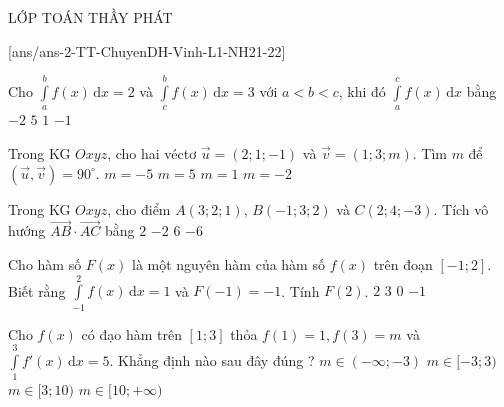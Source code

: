 \begin{name}
{\tenchude}{\tendethi}{LỚP TOÁN THẦY PHÁT}{\thoigian}
\end{name}

[ans/ans-2-TT-ChuyenDH-Vinh-L1-NH21-22]
\begin{ex}%
Cho $\displaystyle\int\limits_a^b f(x)\mathrm{\,d}x=2$ và $\displaystyle\int\limits_c^b f(x)\mathrm{\,d}x=3$ với $a<b<c$, khi đó $\displaystyle\int\limits_a^c f(x)\mathrm{\,d}x$ bằng
\choice
{$-2$}
{$5$}
{$1$}
{\True $-1$}
\end{ex}

\begin{ex}%
Trong KG $Oxyz$, cho hai véctơ $\vec{u}=\left(2;1;-1\right)$ và $\vec{v}=\left(1;3;m\right)$. Tìm $m$ để $\left(\vec{u},\vec{v}\right)=90^\circ$.
\choice
{$m=-5$}
{\True $m=5$}
{$m=1$}
{$m=-2$}
\end{ex}

\begin{ex}%
Trong KG $Oxyz$, cho điểm $A\left(3;2;1\right)$, $B\left(-1;3;2\right)$ và $C\left(2;4;-3\right)$. Tích vô hướng $\vec{AB}\cdot \vec{AC}$ bằng
\choice
{\True $2$}
{$-2$}
{$6$}
{$-6$}
\end{ex}

\begin{ex}%
Cho hàm số $F(x)$ là một nguyên hàm của hàm số $f(x)$ trên đoạn $[-1; 2]$. Biết rằng $\displaystyle\int\limits_{-1}^2 f(x)\mathrm{\,d}x=1$ và $F(-1)=-1$. Tính $F(2)$.
\choice
{$2$}
{$3$}
{\True $0$}
{$-1$}
\end{ex}

\begin{ex}%
Cho $f(x)$ có đạo hàm trên $[1; 3]$ thỏa $f(1)=1, f(3)=m$ và $\displaystyle\int\limits_1^3 f'(x)\mathrm{\,d}x=5$. Khẳng định nào sau đây đúng ?
\choice
{$m \in(-\infty; -3)$}
{$m \in[-3; 3)$}
{\True $m \in[3; 10)$}
{$m \in[10;+ \infty)$}
\loigiai{
Ta có $\displaystyle\int\limits_1^3 f'(x) \mathrm{\,d}x=f(x)\Big|_1^3=f(3)-f(1)=m-1$.\\
Suy ra $m-1=5\Leftrightarrow m=6\in [3;10)$.
}
\end{ex}

